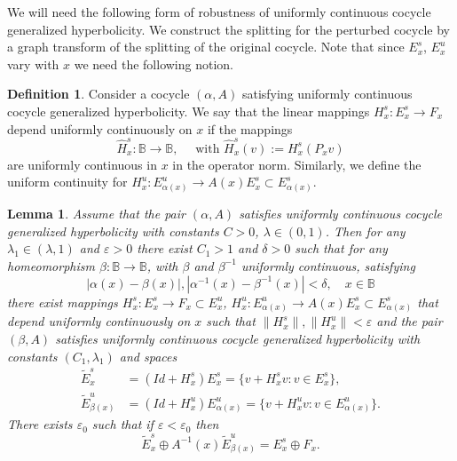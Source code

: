 \documentclass[12pt]{article}
\newcommand{\Bb}{\mathbb{B}}
\newtheorem{lem}[thm]{Lemma}
\theoremstyle{definition}
\newtheorem{defin}[thm]{Definition}
\begin{document}
We will need the following form of robustness of uniformly continuous cocycle generalized hyperbolicity. We construct the splitting for the perturbed cocycle by a graph transform of the splitting of the original cocycle. Note that since $E^s_x$, $E^u_x$ vary with $x$ we need the following notion.
\begin{defin}
    Consider a cocycle $(\alpha, A)$ satisfying uniformly continuous cocycle generalized hyperbolicity. We say that the linear mappings $H^s_x:E^s_x \to F_x$ depend uniformly continuously on $x$ if the mappings
    $$
        \hat{H}^s_x:\mathbb{B} \to \mathbb{B}, \quad \mbox{ with $\hat{H}^s_x(v) := H^s_x(P_x v)$}
    $$
    are uniformly continuous in $x$ in the operator norm.
 Similarly, we define the uniform continuity for $H^u_{x}: E_{\alpha(x)}^u \to A(x)E_x^s \subset E_{\alpha(x)}^s$.
\end{defin}

\begin{lem}\label{lem:SS2}
    Assume that the pair $(\alpha, A)$ satisfies uniformly continuous cocycle generalized hyperbolicity with constants $C > 0$, $\lambda \in (0, 1)$. Then for any $\lambda_1 \in (\lambda, 1)$ and $\varepsilon >0$ there exist $C_1 > 1$ and $\delta >0$ such that for any homeomorphism $\beta: \Bb \to \Bb$, with $\beta$ and $\beta^{-1}$ uniformly continuous, satisfying 
\begin{equation}\label{eq:al-be-ep}
    |\alpha(x) - \beta(x)|, |\alpha^{-1}(x) - \beta^{-1}(x)| < \delta, \quad x \in \Bb    
\end{equation}
 there exist mappings $H^s_x: E_x^s \to F_x \subset E_x^u$, $H^u_{x}: E_{\alpha(x)}^u \to A(x)E_x^s \subset E_{\alpha(x)}^s$ that depend uniformly continuously on $x$ such that
    $
    \|H^s_x\|, \|H^u_x\| < \varepsilon
    $
    and the pair $(\beta, A)$ satisfies uniformly continuous cocycle generalized hyperbolicity with constants $(C_1, \lambda_1)$ and spaces 
\begin{align*}
    \tilde{E}_x^s &= (Id + H^s_x)E^s_x = \{v+H^s_x v: v \in E^s_x\},\\
        \tilde{E}_{\beta(x)}^u &= (Id + H^u_x)E^u_{\alpha(x)} = \{v+H^u_x v: v \in E^u_{\alpha(x)}\}.    
\end{align*}
There exists $\varepsilon_0$ such that if $\varepsilon < \varepsilon_0$ then 
\begin{equation}\label{eq:tildeE-EF}
    \tilde{E}^s_x \oplus A^{-1}(x)\tilde{E}^u_{\beta(x)} = E^s_x \oplus F_x.
\end{equation}
\end{lem}
\end{document}
